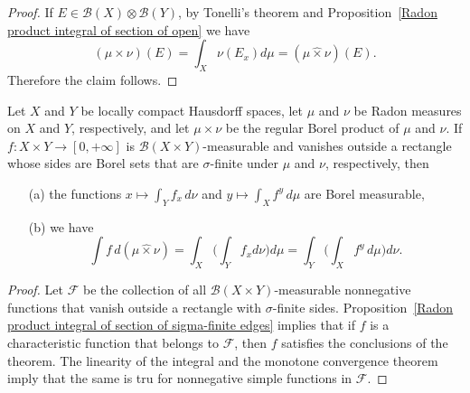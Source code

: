 \begin{proof}
If $E\in\mathcal{B}(X)\otimes\mathcal{B}(Y)$, by Tonelli's theorem and Proposition~\ref{Radon product integral of section of open} we have
\[(\mu\times \nu)(E)=\int_X\nu(E_x)d\mu=(\mu\hat{\times}\nu)(E).\]
Therefore the claim follows.
\end{proof}
\begin{theorem}\label{Radon Tonelli's theorem}
Let $X$ and $Y$ be locally compact Hausdorff spaces, let $\mu$ and $\nu$ be Radon measures on $X$ and $Y$, respectively, and let $\mu\times\nu$ be the regular Borel product of $\mu$ and $\nu$. If $f:X\times Y\to[0,+\infty]$ is $\mathcal{B}(X\times Y)$-measurable and vanishes outside a rectangle whose sides are Borel sets that are $\sigma$-finite under $\mu$ and $\nu$, respectively, then
\begin{itemize}
\item[(a)] the functions $x\mapsto\int_Yf_x\,d\nu$ and $y\mapsto\int_Xf^y\,d\mu$ are Borel measurable,
\item[(b)] we have
\[\int f\,d(\mu\hat{\times}\nu)=\int_X\Big(\int_Yf_xd\nu\Big)d\mu=\int_Y\Big(\int_Xf^y\,d\mu\Big)d\nu.\]   
\end{itemize}
\end{theorem}
\begin{proof}
Let $\mathscr{F}$ be the collection of all $\mathcal{B}(X\times Y)$-measurable nonnegative functions that vanish outside a rectangle with $\sigma$-finite sides. Proposition~\ref{Radon product integral of section of sigma-finite edges} implies that if $f$ is a characteristic function that belongs to $\mathscr{F}$, then $f$ satisfies the conclusions of the theorem. The linearity of the integral and the monotone convergence theorem imply that the same is tru for nonnegative simple functions in $\mathscr{F}$.
\end{proof}
